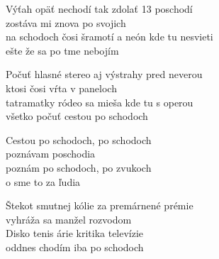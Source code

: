 
\ve{}
Výťah opäť nechodí tak zdolať 13 poschodí\\
zostáva mi znova po svojich\\
na schodoch čosi šramotí a neón kde tu nesvieti\\
ešte že sa po tme nebojím

\ve{}
Počuť hlasné stereo aj výstrahy pred neverou\\
ktosi čosi vŕta v paneloch\\
tatramatky ródeo sa mieša kde tu s operou\\
všetko počuť cestou po schodoch

\cho{}
Cestou po schodoch, po schodoch\\
poznávam poschodia\\
poznám po schodoch, po zvukoch\\
o sme to za ľudia

\ve{}
Štekot smutnej kólie za premárnené prémie\\
vyhráža sa manžel rozvodom\\
Disko tenis árie kritika televízie\\
oddnes chodím iba po schodoch 

\cho{}

\esong{}